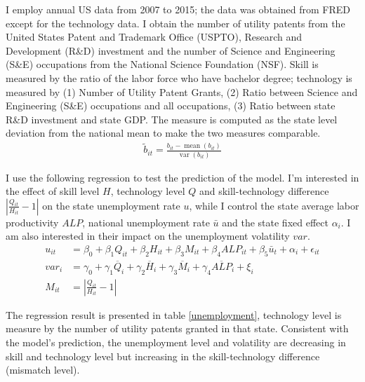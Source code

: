 \documentclass[12pt]{article}
\newcommand{\1}{\mathbb{1}}
\DeclareMathOperator{\mean}{mean}
\DeclareMathOperator{\var}{var}
\begin{document}
I employ annual US data from 2007 to 2015; the data was obtained from FRED except for the technology data. I obtain the number of utility patents from the United States Patent and Trademark Office (USPTO), Research and Development (R\&D) investment and the number of Science and Engineering (S\&E) occupations from the National Science Foundation (NSF). Skill is measured by the ratio of the labor force who have bachelor degree; technology is measured by (1) Number of Utility Patent Grants, (2) Ratio between Science and Engineering (S\&E) occupations and all occupations, (3) Ratio between state R\&D investment and state GDP. The measure is computed as the state level deviation from the national mean to make the two measures comparable.
\begin{align*}
\tilde{b}_{it} = \frac{b_{it}-\mean(b_{it})}{\var(b_{it})}
\end{align*}

I use the following regression to test the prediction of the model. I'm interested in the effect of skill level $H$, technology level $Q$ and skill-technology difference $|\frac{Q_{it}}{H_{it}}-1|$ on the state unemployment rate $u$, while I control the state average labor productivity $ALP$, national unemployment rate $\bar{u}$ and the state fixed effect $\alpha_i$. I am also interested in their impact on the unemployment volatility $var$. 
\begin{align*}
u_{it} &= \beta_0+\beta_1Q_{it} +\beta_2 H_{it}+ \beta_3M_{it} +\beta_4 ALP_{it} +\beta_5\bar{u}_t+\alpha_i+\epsilon_{it} \\
var_{i} &= \gamma_0+\gamma_1\overline{Q}_{i} +\gamma_2 \overline{H}_{i}+ \gamma_3\overline{M}_{i} +\gamma_4 \overline{ALP}_{i} +\xi_{i}  \\
M_{it} &= |\frac{Q_{it}}{H_{it}}-1| 
\end{align*}

The regression result is presented in table \ref{unemployment}, technology level is measure by the number of utility patents granted in that state. Consistent with the model's prediction, the unemployment level and volatility are decreasing in skill and technology level but increasing in the skill-technology difference (mismatch level).
\end{document}
